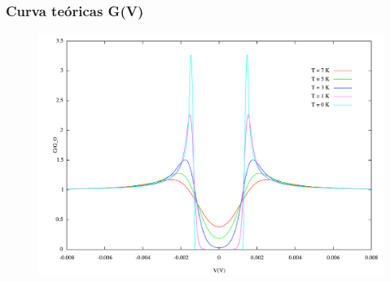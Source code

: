 \begin{frame}
\frametitle{Curva te\'oricas G(V)}

\begin{figure}[!h] \label{gv_teorico}
\includegraphics[width=\textwidth]{gv_teorico}
\end{figure}

\end{frame}


